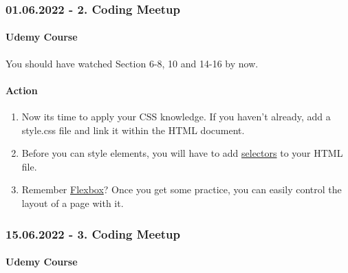 \documentclass[
]{article}
\providecommand{\tightlist}{%
  \setlength{\itemsep}{0pt}\setlength{\parskip}{0pt}}
\begin{document}
\hypertarget{coding-meetup-1}{%
\subsubsection*{01.06.2022 - 2. Coding Meetup}\label{coding-meetup-1}}

\hypertarget{udemy-course-1}{%
\paragraph*{Udemy Course}\label{udemy-course-1}}

You should have watched Section 6-8, 10 and 14-16 by now.

\hypertarget{action-1}{%
\paragraph*{Action}\label{action-1}}

\begin{enumerate}
\def\labelenumi{\arabic{enumi}.}
\tightlist
\item
  Now its time to apply your CSS knowledge. If you haven't already, add a style.css file and link it within the HTML document.
\item
  Before you can style elements, you will have to add \href{https://www.udemy.com/course/the-web-developer-bootcamp/learn/lecture/21917636\#overview}{selectors} to your HTML file.
\item
  Remember \href{https://www.udemy.com/course/the-web-developer-bootcamp/learn/lecture/21917734\#overview}{Flexbox}? Once you get some practice, you can easily control the layout of a page with it.
\end{enumerate}

\hypertarget{coding-meetup-2}{%
\subsubsection*{15.06.2022 - 3. Coding Meetup}\label{coding-meetup-2}}

\hypertarget{udemy-course-2}{%
\paragraph*{Udemy Course}\label{udemy-course-2}}
\end{document}
